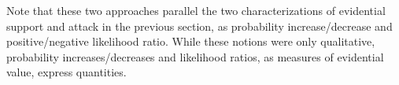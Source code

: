 \documentclass[10pt]{article}
\begin{document}
Note that these two approaches parallel the two characterizations of evidential support and attack in the previous 
section, as probability increase/decrease and positive/negative likelihood ratio. While these notions were only qualitative, 
probability increases/decreases and likelihood ratios, as measures of evidential value, express quantities. 

 
 
\end{document}
